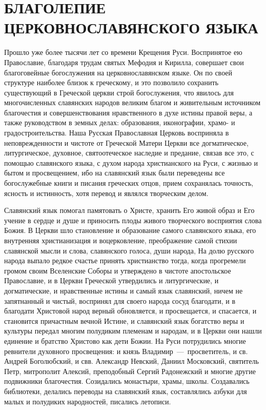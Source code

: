 \documentclass[11pt,a4paper]{memoir}
\begin{document}
    
    \tableofcontents
    
    \frontmatter
    
    \chapter*{\small БЛАГОЛЕПИЕ ЦЕРКОВНОСЛАВЯНСКОГО ЯЗЫКА}
    Прошло уже более тысячи лет со времени Крещения Руси. Воспринятое ею Православие, благодаря трудам святых Мефодия и Кирилла, совершает свои благоговейные богослужения на церковнославянском языке. Он по своей структуре наиболее близок к греческому, и это позволило сохранить существующий в Греческой церкви строй богослужения, что явилось для многочисленных славянских народов великим благом и живительным источником благочестия и совершенствования нравственного в духе истины правой веры, а также руководством в земных делах: образования, иконографии, храмо- и градостроительства. Наша Русская Православная Церковь восприняла в неповрежденности и чистоте от Греческой Матери Церкви все догматическое, литургическое, духовное, святоотеческое наследие и предание, связав все это, с помощью славянского языка, с духом народа христианского на Руси, с жизнью и бытом и просвещением, ибо на славянский язык были переведены все богослужебные книги и писания греческих отцов, прием сохранялась точность, ясность и истинность, хотя перевод и являлся творческим делом.
    
    Славянский язык помогал памятовать о Христе, хранить Его живой образ и Его учение в сердце и душе и приносить плоды живого творческого восприятия слова Божия. В Церкви шло становление и образование самого славянского языка, его внутренняя христианизация и воцерковление, преображение самой стихии славянской мысли и слова, славянского голоса, души народа, На долю русского народа выпало редкое счастье принять христианство тогда, когда прогремели громом своим Вселенские Соборы и утверждено в чистоте апостольское Православие, и в Церкви Греческой утвердились и литургические, и догматические, и нравственные истины и самый язык славянский, ничем не запятнанный и чистый, воспринял для своего народа сосуд благодати, и в благодати Христовой народ верный обновляется, и просвещается, и спасается, и становится причастным вечной Истине, и славянский язык богатство веры и культуры передал многим полудиким племенам и народам, и в Церкви они нашли единение и братство Христово как дети Божии. На Руси потрудились многие ревнители духовного просвещения: и князь Владимир~---~просветитель, и св. Андрей Боголюбский, и свв. Александр Невский, Даниил Московский, святитель Петр, митрополит Алексий, преподобный Сергий Радонежский и многие другие подвижники благочестия. Созидались монастыри, храмы, школы. Создавались библиотеки, делались переводы на славянский язык, составлялись азбуки для малых и полудиких народностей, писались летописи.
    
\end{document}
